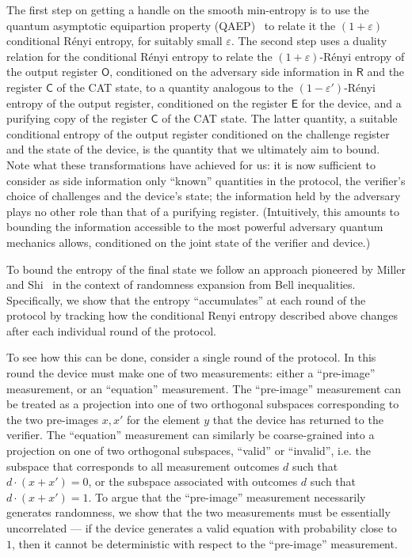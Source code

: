 \documentclass[11pt]{article}
\theoremstyle{remark}
\theoremstyle{definition}
\newcommand{\reg}[1]{{\textsf{#1}}}
\newcommand{\eps}{\varepsilon}
\begin{document}
The first step on getting a handle on the smooth min-entropy is to use the quantum asymptotic equipartion property (QAEP)~\cite{tomamichel2009fully} to relate it the $(1+\eps)$ conditional R\'enyi entropy, for suitably small $\eps$. The second step uses a duality relation for the conditional R\'enyi entropy to relate the $(1+\eps)$-R\'enyi entropy of the output register $\reg{O}$, conditioned on the adversary side information in $\reg{R}$ and the register $\reg{C}$ of the CAT state, to a quantity analogous to the $(1-\eps')$-R\'enyi entropy of the output register, conditioned on the register $\reg{E}$ for the device, and a purifying copy of the register $\reg{C}$ of the CAT state. The latter quantity, a suitable conditional entropy of the output register conditioned on the challenge register and the state of the device, is the quantity that we ultimately aim to bound. Note what these transformations have achieved for us: it is now sufficient to consider as side information only ``known'' quantities in the protocol, the verifier's choice of challenges and the device's state; the information held by the adversary plays no other role than that of a purifying register. (Intuitively, this amounts to bounding the information accessible to the most powerful adversary quantum mechanics allows, conditioned on the joint state of the verifier and device.)

To bound the entropy of the final state we follow an approach pioneered by Miller and Shi~\cite{miller2014universal} in the context of randomness expansion from Bell inequalities. Specifically, we show that the entropy ``accumulates'' at each round of the protocol by tracking how the conditional Renyi entropy described above changes after each individual round of the protocol. 

To see how this can be done,  consider a single round of the protocol. In this round the device must make one of two measurements: either a ``pre-image'' measurement, or an ``equation'' measurement. The ``pre-image'' measurement can be treated as a projection into one of two orthogonal subspaces corresponding to the two pre-images $x,x'$ for the element $y$ that the device has returned to the verifier. The ``equation''
measurement can similarly be coarse-grained into a projection on one of two orthogonal subspaces, ``valid'' or ``invalid'', i.e. the subspace that corresponds to all measurement outcomes $d$ such that $d\cdot(x + x') = 0$, or the subspace associated with outcomes $d$ such that $d\cdot(x + x') = 1$.
To argue that the ``pre-image'' measurement necessarily generates randomness, we show that the two measurements must be essentially uncorrelated --- if the device generates a valid equation with probability close to $1$, then it cannot be deterministic with respect to the ``pre-image'' measurement. 
\end{document}
